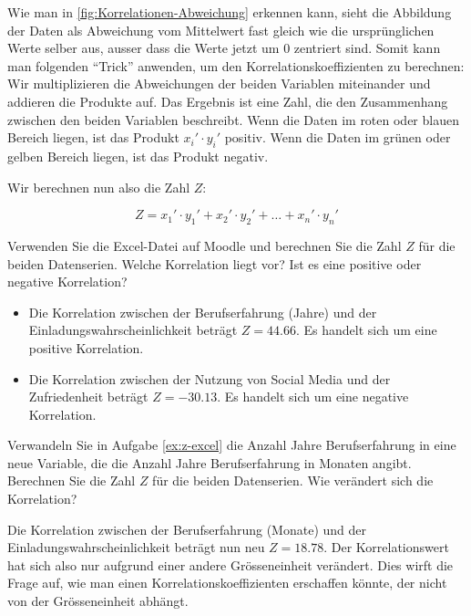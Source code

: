 Wie man in \cref{fig:Korrelationen-Abweichung} erkennen kann, sieht die Abbildung der Daten als Abweichung vom Mittelwert fast gleich wie die ursprünglichen Werte selber aus, ausser dass die Werte jetzt um 0 zentriert sind. Somit kann man folgenden \enquote{Trick} anwenden, um den Korrelationskoeffizienten zu berechnen: Wir multiplizieren die Abweichungen der beiden Variablen miteinander und addieren die Produkte auf. Das Ergebnis ist eine Zahl, die den Zusammenhang zwischen den beiden Variablen beschreibt. Wenn die Daten im roten oder blauen Bereich liegen, ist das Produkt \(x_i' \cdot y_i'\) positiv. Wenn die Daten im grünen oder gelben Bereich liegen, ist das Produkt negativ.

Wir berechnen nun also die Zahl \(Z\):

\[
    Z = x_1' \cdot y_1' + x_2' \cdot y_2' + \dots + x_n' \cdot y_n'
\]


\begin{myexercise}\label{ex:z-excel}
    Verwenden Sie die Excel-Datei auf Moodle und berechnen Sie die Zahl \(Z\) für die beiden Datenserien. Welche Korrelation liegt vor? Ist es eine positive oder negative Korrelation?
    \begin{myanswer}
        \begin{itemize}
            \item Die Korrelation zwischen der Berufserfahrung (Jahre) und der Einladungswahrscheinlichkeit beträgt \(Z = 44.66\). Es handelt sich um eine positive Korrelation.
            \item Die Korrelation zwischen der Nutzung von Social Media und der Zufriedenheit beträgt \(Z = -30.13\). Es handelt sich um eine negative Korrelation.
        \end{itemize}
    \end{myanswer}
\end{myexercise}
\begin{myexercise}\label{ex:z-excel2}
    Verwandeln Sie in Aufgabe \cref{ex:z-excel} die Anzahl Jahre Berufserfahrung in eine neue Variable, die die Anzahl Jahre Berufserfahrung in Monaten angibt. Berechnen Sie die Zahl \(Z\) für die beiden Datenserien. Wie verändert sich die Korrelation?
    \begin{myanswer}
        Die Korrelation zwischen der Berufserfahrung (Monate) und der Einladungswahrscheinlichkeit beträgt nun neu \(Z = 18.78\). Der Korrelationswert hat sich also nur aufgrund einer andere Grösseneinheit verändert. Dies wirft die Frage auf, wie man einen Korrelationskoeffizienten erschaffen könnte, der nicht von der Grösseneinheit abhängt.
    \end{myanswer}
\end{myexercise}


